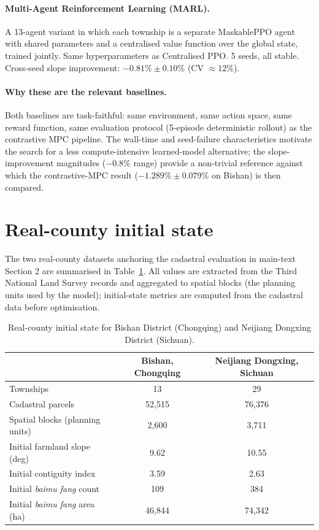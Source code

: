 \documentclass[11pt]{article}
\begin{document}
\paragraph{Multi-Agent Reinforcement Learning (MARL).} A 13-agent variant in which each township is a separate MaskablePPO agent with shared parameters and a centralised value function over the global state, trained jointly. Same hyperparameters as Centralised PPO. 5 seeds, all stable. Cross-seed slope improvement: $-0.81\% \pm 0.10\%$ (CV $\approx 12\%$).

\paragraph{Why these are the relevant baselines.} Both baselines are task-faithful: same environment, same action space, same reward function, same evaluation protocol (5-episode deterministic rollout) as the contrastive MPC pipeline. The wall-time and seed-failure characteristics motivate the search for a less compute-intensive learned-model alternative; the slope-improvement magnitudes ($-0.8\%$ range) provide a non-trivial reference against which the contrastive-MPC result ($-1.289\% \pm 0.079\%$ on Bishan) is then compared.

\section{Real-county initial state}\label{si:counties}

The two real-county datasets anchoring the cadastral evaluation in main-text Section 2 are summarised in Table~\ref{tab:si-counties}. All values are extracted from the Third National Land Survey records and aggregated to spatial blocks (the planning units used by the model); initial-state metrics are computed from the cadastral data before optimisation.

\begin{table}[htbp]
\centering
\small
\caption{Real-county initial state for Bishan District (Chongqing) and Neijiang Dongxing District (Sichuan).}
\label{tab:si-counties}
\begin{tabular}{lcc}
\toprule
 & Bishan, Chongqing & Neijiang Dongxing, Sichuan \\
\midrule
Townships                                & 13       & 29       \\
Cadastral parcels                        & 52{,}515 & 76{,}376 \\
Spatial blocks (planning units)          & 2{,}600  & 3{,}711  \\
Initial farmland slope (deg)             & 9.62     & 10.55    \\
Initial contiguity index                 & 3.59     & 2.63     \\
Initial \textit{baimu fang} count        & 109      & 384      \\
Initial \textit{baimu fang} area (ha)    & 46{,}844 & 74{,}342 \\
\bottomrule
\end{tabular}
\end{table}
\end{document}

